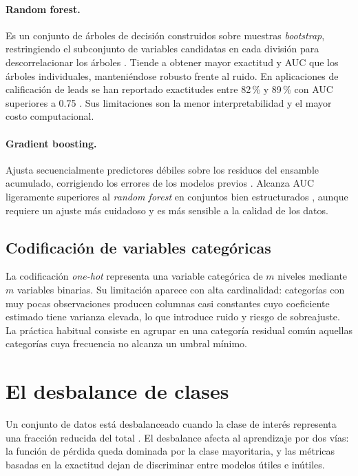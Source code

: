\paragraph{Random forest.} Es un conjunto de árboles de decisión construidos sobre
muestras \emph{bootstrap}, restringiendo el subconjunto de variables candidatas en
cada división para descorrelacionar los árboles \cite{breiman2001random}. Tiende a
obtener mayor exactitud y AUC que los árboles individuales, manteniéndose robusto
frente al ruido. En aplicaciones de calificación de leads se han reportado
exactitudes entre 82\,\% y 89\,\% con AUC superiores a 0.75
\cite{nygard2020automating, tan2024leveraging}. Sus limitaciones son la menor
interpretabilidad y el mayor costo computacional.

\paragraph{Gradient boosting.} Ajusta secuencialmente predictores débiles sobre los
residuos del ensamble acumulado, corrigiendo los errores de los modelos previos
\cite{hastie2009elements}. Alcanza AUC ligeramente superiores al \emph{random
forest} en conjuntos bien estructurados \cite{nygard2020automating}, aunque
requiere un ajuste más cuidadoso y es más sensible a la calidad de los datos.

\subsection{Codificación de variables categóricas}

La codificación \emph{one-hot} representa una variable categórica de $m$ niveles
mediante $m$ variables binarias. Su limitación aparece con alta cardinalidad:
categorías con muy pocas observaciones producen columnas casi constantes cuyo
coeficiente estimado tiene varianza elevada, lo que introduce ruido y riesgo de
sobreajuste. La práctica habitual consiste en agrupar en una categoría residual
común aquellas categorías cuya frecuencia no alcanza un umbral mínimo.

\section{El desbalance de clases}
\label{sec:mt-desbalance}

Un conjunto de datos está desbalanceado cuando la clase de interés representa una
fracción reducida del total \cite{fernandez2018learning}. El desbalance afecta al
aprendizaje por dos vías: la función de pérdida queda dominada por la clase
mayoritaria, y las métricas basadas en la exactitud dejan de discriminar entre
modelos útiles e inútiles.

